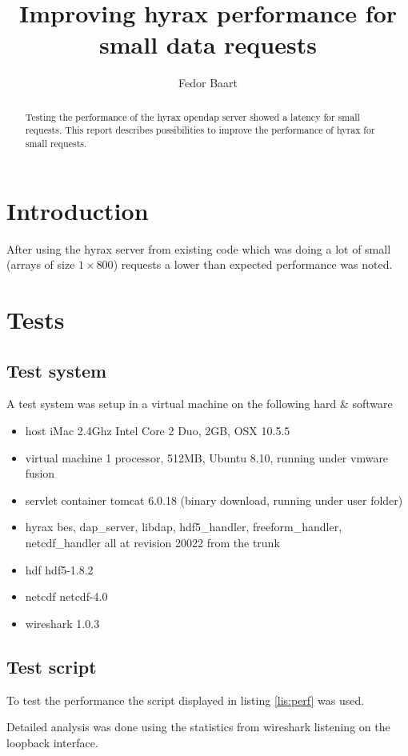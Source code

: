 \documentclass{article}
\author{Fedor Baart}
\title{Improving hyrax performance for small data requests}
\begin{document}
\maketitle
\begin{abstract}
  Testing the performance of the hyrax opendap server showed a latency for small requests. This report describes possibilities to improve the performance of hyrax for small requests. 
\end{abstract}
\section{Introduction}
After using the hyrax server from existing code which was doing a lot of small (arrays of size $1 \times 800$) requests a lower than expected performance was noted. 

\section{Tests}
\subsection{Test system}
A test system was setup in a virtual machine on the following hard \& software
\begin{itemize}
\item{host} iMac 2.4Ghz Intel Core 2 Duo, 2GB, OSX 10.5.5
\item{virtual machine} 1 processor, 512MB, Ubuntu 8.10, running under vmware fusion
\item{servlet container} tomcat 6.0.18 (binary download, running under user folder)
\item{hyrax} bes, dap\_server, libdap, hdf5\_handler, freeform\_handler, netcdf\_handler   all at revision 20022 from the trunk 
\item{hdf} hdf5-1.8.2
\item{netcdf} netcdf-4.0
\item{wireshark} 1.0.3
\end{itemize}
\subsection{Test script}
To test the performance the script displayed in listing \ref{lis:perf} was used. 

Detailed analysis was done using the statistics from wireshark listening on the loopback interface. 
\end{document}
